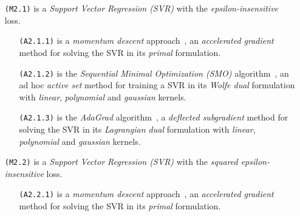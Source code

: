 \begin{itemize}
\item[\texttt{(M2.1)}] is a \emph{Support Vector Regression (SVR)} with the \emph{epsilon-insensitive} loss.

\begin{itemize}
\item[\texttt{(A2.1.1)}] is a \emph{momentum descent} approach~\cite{polyak1964some, nesterov1998introductory}, an \emph{accelerated gradient} method for solving the SVR in its \emph{primal} formulation.

\item[\texttt{(A2.1.2)}] is the \emph{Sequential Minimal Optimization (SMO)} algorithm~\cite{flake2002efficient, shevade1999improvements}, an ad hoc \emph{active set} method for training a SVR in its \emph{Wolfe dual} formulation with \emph{linear}, \emph{polynomial} and \emph{gaussian} kernels.

\item[\texttt{(A2.1.3)}] is the \emph{AdaGrad} algorithm~\cite{duchi2011adaptive}, a \emph{deflected subgradient} method for solving the SVR in its \emph{Lagrangian dual} formulation with \emph{linear}, \emph{polynomial} and \emph{gaussian} kernels.
\end{itemize}

\end{itemize}

\begin{itemize}
\item[\texttt{(M2.2)}] is a \emph{Support Vector Regression (SVR)} with the \emph{squared epsilon-insensitive} loss.

\begin{itemize}
\item[\texttt{(A2.2.1)}] is a \emph{momentum descent} approach~\cite{polyak1964some, nesterov1998introductory}, an \emph{accelerated gradient} method for solving the SVR in its \emph{primal} formulation.
\end{itemize}

\end{itemize}